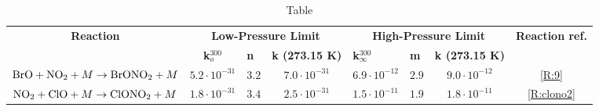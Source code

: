 \begin{table}[]
{\begin{tabular}{|c|ccc|c|c|c|l|}
\multirow{2}{*}{\textbf{Reaction}}                                   & \multicolumn{3}{c}{\textbf{Low-Pressure Limit}}                                                                          & \multicolumn{3}{c|}{\textbf{High-Pressure Limit}}                                                                             & \multirow{2}{*}{\textbf{Reaction ref.}} \\ \cline{2-7}
                                                                     & \multicolumn{1}{c|}{\textbf{k$_o^{300}$}} & \multicolumn{1}{l|}{\textbf{n}} & \multicolumn{1}{l|}{\textbf{k (273.15 K)}} & \multicolumn{1}{l|}{\textbf{k$_\infty^{300}$}} & \multicolumn{1}{l|}{\textbf{m}} & \multicolumn{1}{l|}{\textbf{k (273.15 K)}} &                                         \\ \hline
$\mathrm{BrO} + \mathrm{NO_2} + M \rightarrow \mathrm{BrONO_2} + M$        & \multicolumn{1}{c|}{$5.2\cdot10^{-31}$}   & \multicolumn{1}{c|}{$3.2$}      & $7.0\cdot10^{-31}$                         & $6.9\cdot10^{-12}$                             & $2.9$                           & $9.0\cdot10^{-12}$                         & \multicolumn{1}{c|}{\ref{R:9}}          \\
$\mathrm{NO_2} + \mathrm{ClO} + M \rightarrow \mathrm{ClONO_2} + M $       & \multicolumn{1}{c|}{$1.8\cdot10^{-31}$}   & \multicolumn{1}{c|}{$3.4$}      & $2.5\cdot10^{-31}$                         & $1.5\cdot10^{-11}$                             & $1.9$                           & $1.8\cdot10^{-11}$                         & \multicolumn{1}{c|}{\ref{R:clono2}}     \\ \hline
\end{tabular}
}
\caption{Table}
\label{tab:2b_and_3b_reactions}
\end{table}